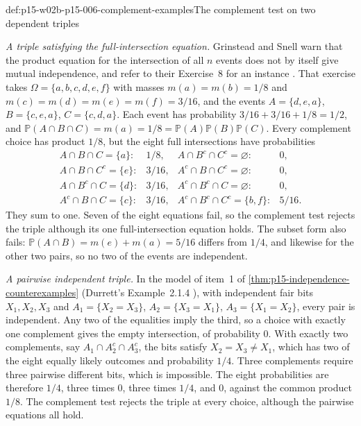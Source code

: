 \begin{hbexample}{def:p15-w02b-p15-006-complement-examples}{The complement test on two dependent triples}
\par\nobreak
\emph{A triple satisfying the full-intersection equation.} Grinstead
and Snell warn that the product equation for the intersection of all
\(n\) events does not by itself give mutual independence, and refer to
their Exercise~8 for an instance
\cite[sec.~4.1, p.~141]{GrinsteadSnellChance2006}. That exercise
\cite[sec.~4.1, p.~151]{GrinsteadSnellChance2006}
takes \(\Omega=\{a,b,c,d,e,f\}\) with masses
\(m(a)=m(b)=1/8\) and \(m(c)=m(d)=m(e)=m(f)=3/16\), and the events
\(A=\{d,e,a\}\), \(B=\{c,e,a\}\), \(C=\{c,d,a\}\). Each event has
probability \(3/16+3/16+1/8=1/2\), and
\(\mathbb P(A\cap B\cap C)=m(a)=1/8=\mathbb P(A)\mathbb P(B)\mathbb P(C)\).
Every complement choice has product \(1/8\), but the eight full
intersections have probabilities
\[
\begin{array}{lclc}
 A\cap B\cap C=\{a\}:&1/8,&A\cap B^c\cap C^c=\varnothing:&0,\\
 A\cap B\cap C^c=\{e\}:&3/16,&A^c\cap B\cap C^c=\varnothing:&0,\\
 A\cap B^c\cap C=\{d\}:&3/16,&A^c\cap B^c\cap C=\varnothing:&0,\\
 A^c\cap B\cap C=\{c\}:&3/16,&A^c\cap B^c\cap C^c=\{b,f\}:&5/16.
\end{array}
\]
They sum to one. Seven of the eight equations fail, so the complement
test rejects the triple although its one full-intersection equation
holds. The subset form also fails: \(\mathbb P(A\cap B)=m(e)+m(a)=5/16\)
differs from \(1/4\), and likewise for the other two pairs, so no two
of the events are independent.

\emph{A pairwise independent triple.} In the model of item~1 of
\cref{thm:p15-independence-counterexamples} (Durrett's Example~2.1.4
\cite[p.~45]{DurrettPTEAuthor2019}), with independent fair bits
\(X_1,X_2,X_3\) and \(A_1=\{X_2=X_3\}\), \(A_2=\{X_3=X_1\}\),
\(A_3=\{X_1=X_2\}\), every pair is independent. Any two of the
equalities imply the third, so a choice with exactly one complement
gives the empty intersection, of probability \(0\). With exactly two
complements, say \(A_1\cap A_2^c\cap A_3^c\), the bits satisfy
\(X_2=X_3\neq X_1\), which has two of the eight equally likely
outcomes and probability \(1/4\). Three complements require three
pairwise different bits, which is impossible. The eight probabilities
are therefore \(1/4\), three times \(0\), three times \(1/4\), and
\(0\), against the common product \(1/8\). The complement test rejects
the triple at every choice, although the pairwise equations all hold.
\end{hbexample}

